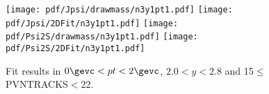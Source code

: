 \begin{figure}[H]
\begin{center}
\texttt{[image: pdf/Jpsi/drawmass/n3y1pt1.pdf]}
\texttt{[image: pdf/Jpsi/2DFit/n3y1pt1.pdf]}
\vspace*{-0.5cm}
\texttt{[image: pdf/Psi2S/drawmass/n3y1pt1.pdf]}
\texttt{[image: pdf/Psi2S/2DFit/n3y1pt1.pdf]}
\vspace*{-0.5cm}
\end{center}
\caption{Fit results in $0\gevc<pt<2\gevc$, $2.0<y<2.8$ and 15$\leq$PVNTRACKS$<$22.}
\label{Fitn3y1pt1}
\end{figure}
